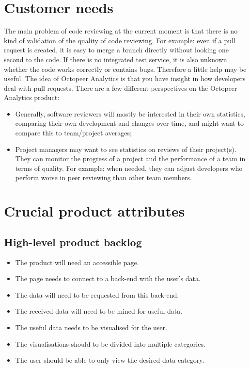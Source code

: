 \documentclass{article}
\begin{document}
\section{Customer needs} \label{section:customerneeds}
The main problem of code reviewing at the current moment is that there is no kind of validation of the quality of code reviewing. For example: even if a pull request is created, it is easy to merge a branch directly without looking one second to the code. If there is no integrated test service, it is also unknown whether the code works correctly or contains bugs. Therefore a little help may be useful. The idea of Octopeer Analytics is that you have insight in how developers deal with pull requests. There are a few different perspectives on the Octopeer Analytics product:
\begin{itemize}
\item Generally, software reviewers will mostly be interested in their own statistics, comparing their own development and changes over time, and might want to compare this to team/project averages;
\item Project managers may want to see statistics on reviews of their project(s). They can monitor the progress of a project and the performance of a team in terms of quality. For example: when needed, they can adjust developers who perform worse in peer reviewing than other team members.
\end{itemize}

\section{Crucial product attributes} \label{section:crucialproductattributes}
\subsection{High-level product backlog} \label{section:highlevelproductbacklog}
    
    \begin{itemize}
        \item The product will need an accessible page.
        \item The page needs to connect to a back-end with the user's data.
        \item The data will need to be requested from this back-end.
        \item The received data will need to be mined for useful data.
        \item The useful data needs to be visualised for the user.
        \item The visualisations should to be divided into multiple categories.
        \item The user should be able to only view the desired data category.
    \end{itemize}
\end{document}
